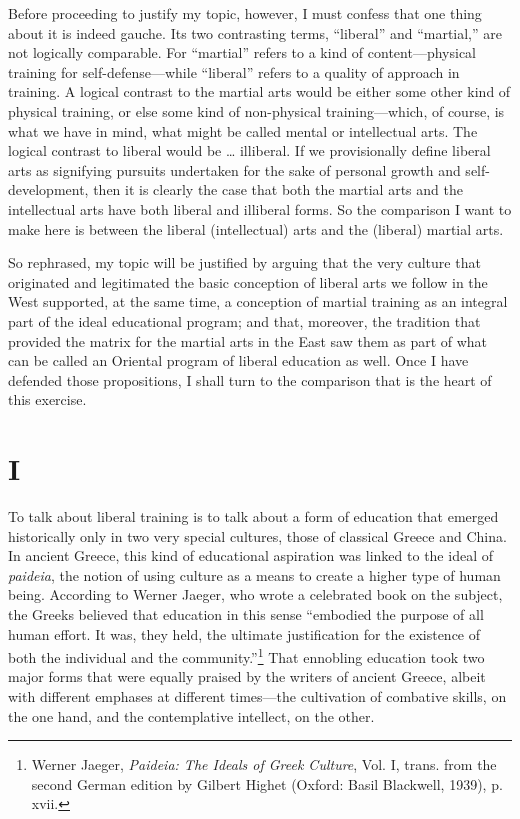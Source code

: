 Before proceeding to justify my topic, however, I must confess that one thing about it is indeed gauche. Its two contrasting terms, ``liberal'' and ``martial,'' are not logically comparable. For ``martial'' refers to a kind of content---physical training for self-defense---while ``liberal'' refers to a quality of approach in training. A logical contrast to the martial arts would be either some other kind of physical training, or else some kind of non-physical training---which, of course, is what we have in mind, what might be called mental or intellectual arts. The logical contrast to liberal would be \ldots{} illiberal. If we provisionally define liberal arts as signifying pursuits undertaken for the sake of personal growth and self-development, then it is clearly the case that both the martial arts and the intellectual arts have both liberal and illiberal forms. So the comparison I want to make here is between the liberal (intellectual) arts and the (liberal) martial arts. 

So rephrased, my topic will be justified by arguing that the very culture that originated and legitimated the basic conception of liberal arts we follow in the West supported, at the same time, a conception of martial training as an integral part of the ideal educational program; and that, moreover, the tradition that provided the matrix for the martial arts in the East saw them as part of what can be called an Oriental program of liberal education as well.  Once I have defended those propositions, I shall turn to the comparison that is the heart of this exercise.

\section*{I}

To talk about liberal training is to talk about a form of education that emerged historically only in two very special cultures, those of classical Greece and China. In ancient Greece, this kind of educational aspiration was linked to the ideal of \emph{paideia}, the notion of using culture as a means to create a higher type of human being. According to Werner Jaeger, who wrote a celebrated book on the subject, the Greeks believed that education in this sense ``embodied the purpose of all human effort. It was, they held, the ultimate justification for the existence of both the individual and the community.''\footnote{Werner Jaeger, \emph{Paideia: The Ideals of Greek Culture}, Vol. I, trans. from the second German edition by Gilbert Highet (Oxford: Basil Blackwell, 1939), p. xvii.} That ennobling education took two major forms that were equally praised by the writers of ancient Greece, albeit with different emphases at different times---the cultivation of combative skills, on the one hand, and the contemplative intellect, on the other. 

